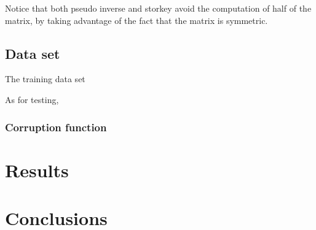 \documentclass[letterpaper,twocolumn,10pt]{article}
\begin{document}
\noindent Notice that both pseudo inverse and storkey avoid the computation of half of the matrix, by taking advantage of the fact that the matrix is symmetric.

\subsection{Data set}
The training data set 

As for testing, 

\subsubsection{Corruption function}


\section{Results}



\section{Conclusions}







\vfill
\break


\onecolumn
\appendix
\label{app:appendixA}
\lstset{basicstyle=\small,style=myCustomMatlabStyle}
\end{document}

